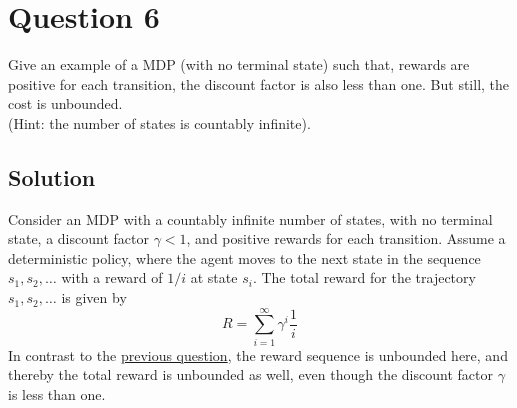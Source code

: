 \section*{Question 6}

Give an example of a MDP (with no terminal state) such that, rewards are positive for each transition, the discount factor is also less than one.
But still, the cost is unbounded. \\
(Hint: the number of states is countably infinite).

\subsection*{Solution}

Consider an MDP with a countably infinite number of states, with no terminal state, a discount factor \( \gamma < 1 \), and positive rewards for each transition.
Assume a deterministic policy, where the agent moves to the next state in the sequence \( s_1, s_2, \dots \) with a reward of \( 1/i \) at state \( s_i \).
The total reward for the trajectory \( s_1, s_2, \dots \) is given by
\[
    R = \sum_{i=1}^{\infty} \gamma^i \frac{1}{i}
\]
In contrast to the \hyperref[sec:q5]{previous question}, the reward sequence is unbounded here, and thereby the total reward is unbounded as well, even though the discount factor \( \gamma \) is less than one.
